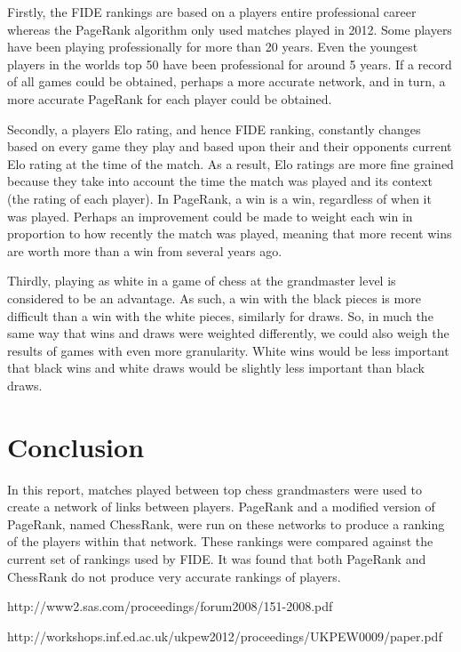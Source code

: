 \documentclass[pdftex,11pt,a4paper]{report}
\begin{document}
Firstly, the FIDE rankings are based on a players entire professional career whereas
the PageRank algorithm only used matches played in 2012. Some players have been
playing professionally for more than 20 years. Even the youngest players in the worlds top 50 have been
professional for around 5 years. If a record of all games could be obtained, perhaps a more accurate
network, and in turn, a more accurate PageRank for each player could be obtained.

Secondly, a players Elo rating, and hence FIDE ranking, constantly changes based on every game 
they play and based upon their and their opponents current Elo rating at the time of the match.
As a result, Elo ratings are more fine grained because they take into account the time
the match was played and its context (the rating of each player). In PageRank, a win
is a win, regardless of when it was played. Perhaps an improvement could be made to
weight each win in proportion to how recently the match was played, meaning that
more recent wins are worth more than a win from several years ago.

Thirdly, playing as white in a game of chess at the grandmaster level is considered to be an advantage.
As such, a win with the black pieces is more difficult than a win with the white pieces, similarly for draws.
So, in much the same way that wins and draws were weighted differently, we could also weigh the results of games
with even more granularity. White wins would be less important that black wins and white draws would be 
slightly less important than black draws.

\chapter{Conclusion}

In this report, matches played between top chess grandmasters were used to create
a network of links between players. PageRank and a modified version of PageRank, named ChessRank,
were run on these networks to produce a ranking of the players within that network. These
rankings were compared against the current set of rankings used by FIDE. It was found that both
PageRank and ChessRank do not produce very accurate rankings of players.













\clearpage{}


\begin{thebibliography}{9}

http://www2.sas.com/proceedings/forum2008/151-2008.pdf

http://workshops.inf.ed.ac.uk/ukpew2012/proceedings/UKPEW0009/paper.pdf




\end{thebibliography}
\end{document}
